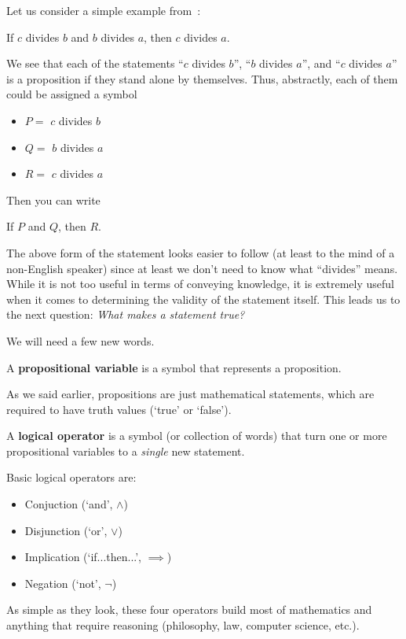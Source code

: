Let us consider a simple example from~\cite{Newstead}:
\begin{example}
    \label{ex:divides}
    If $c$ divides $b$ and $b$ divides $a$, then $c$ divides $a$.
\end{example}

We see that each of the statements ``$c$ divides $b$'', ``$b$ divides $a$'',
and ``$c$ divides $a$'' is a proposition if they stand alone by themselves.
Thus, abstractly, each of them could be assigned a symbol 
    \begin{itemize}
        \item $P =$ $c$ divides $b$
        \item $Q = $ $b$ divides $a$ 
        \item $R = $ $c$ divides $a$ 
    \end{itemize}

Then you can write
\begin{center}
    If $P$ and $Q$, then $R$.
\end{center}
The above form of the statement looks easier to follow (at least to the 
mind of a non-English speaker) since at least 
we don't need to know what ``divides'' means.
While it is not too useful in terms of conveying knowledge, it is 
extremely useful when it comes to determining the validity of the statement itself.
This leads us to the next question: \emph{What makes a statement true?}

We will need a few new words.

\begin{definition}
    A {\bf propositional variable} is a symbol that represents a proposition.
\end{definition}
As we said earlier, propositions are just mathematical statements, which are
required to have truth values (`true' or `false').

\begin{definition}
    A {\bf logical operator} is a symbol (or collection of words) that turn 
    one or more propositional variables to a \emph{single} new statement.
\end{definition}

Basic logical operators are:
\begin{itemize}
    \item Conjuction (`and', $\wedge$)
    \item Disjunction (`or', $\vee$)
    \item Implication (`if...then...', $\implies$)
    \item Negation (`not', $\neg$)
\end{itemize}
As simple as they look, these four operators build most of  mathematics
and anything that require reasoning (philosophy, law, computer science, etc.).



